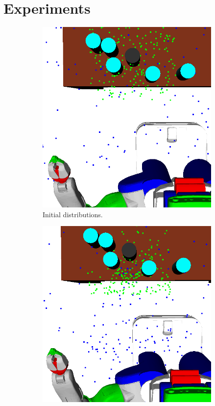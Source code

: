 \section{Experiments}
\begin{figure}[t]
  \centering
  \begin{subfigure}[b]{0.35\linewidth}
    \includegraphics[width=\textwidth]{images/learns.png}
    \caption{Initial distributions.}
  \end{subfigure}
  \begin{subfigure}[b]{0.35\linewidth}
    \includegraphics[width=\textwidth]{images/learn4.png}

\end{subfigure}
\end{figure}

